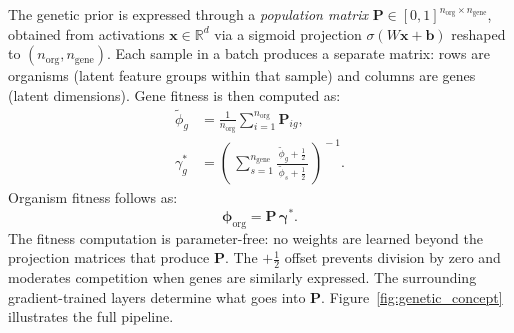 \documentclass[10pt, a4paper, twocolumn]{article}
\begin{document}
The genetic prior is expressed through a \emph{population matrix} $\mathbf{P}\in[0,1]^{n_\mathrm{org}\times n_\mathrm{gene}}$, obtained from activations $\mathbf{x}\in\mathbb{R}^d$ via a sigmoid projection $\sigma(W\mathbf{x}+\mathbf{b})$ reshaped to $(n_\mathrm{org}, n_\mathrm{gene})$. Each sample in a batch produces a separate matrix: rows are organisms (latent feature groups within that sample) and columns are genes (latent dimensions). Gene fitness is then computed as:
%
\begin{align}
  \tilde{\phi}_g
    &= \frac{1}{n_\mathrm{org}}\sum_{i=1}^{n_\mathrm{org}} \mathbf{P}_{ig},
  \label{eq:genemean} \\[2pt]
  \gamma_g^*
    &= \left(\,\sum_{s=1}^{n_\mathrm{gene}}
        \frac{\,\tilde{\phi}_g + \tfrac{1}{2}\,}
             {\tilde{\phi}_s + \tfrac{1}{2}}
       \,\right)^{\!-1}\!\!.
  \label{eq:genefitness}
\end{align}
%
Organism fitness follows as:
%
\begin{equation}
  \boldsymbol{\phi}_\mathrm{org} = \mathbf{P}\,\boldsymbol{\gamma}^*.
  \label{eq:orgfitness}
\end{equation}
%
The fitness computation is parameter-free: no weights are learned beyond the projection matrices that produce $\mathbf{P}$. The $+\tfrac{1}{2}$ offset prevents division by zero and moderates competition when genes are similarly expressed. The surrounding gradient-trained layers determine what goes into $\mathbf{P}$. Figure~\ref{fig:genetic_concept} illustrates the full pipeline.
\end{document}
